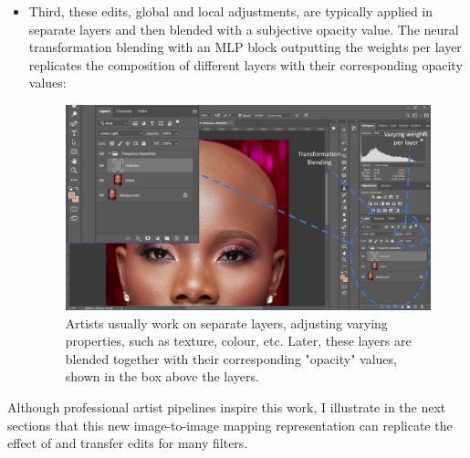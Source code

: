 \begin{itemize}
\begin{figure}[ht]
\label{fig:PS-brush}
\end{figure}

\item Third, these edits, global and local adjustments, are typically applied in separate layers and then blended with a subjective opacity value. The neural transformation blending with an MLP block outputting the weights per layer replicates the composition of different layers with their corresponding opacity values:

\begin{figure}[ht]
\centering
\includegraphics[width=0.55\columnwidth]{Chapters/detail-retouching-figs/PS2.pdf}
    \caption{Artists usually work on separate layers, adjusting varying properties, such as texture, colour, etc. Later, these layers are blended together with their corresponding "opacity" values, shown in the box above the layers.}

\label{fig:PS-all-together}
\end{figure}

\end{itemize}
Although professional artist pipelines inspire this work, I illustrate in the next sections that this new image-to-image mapping representation can replicate the effect of and transfer edits for many filters.
